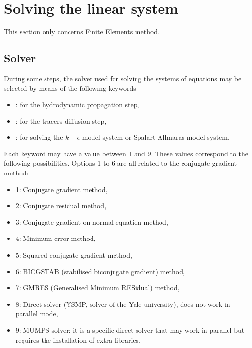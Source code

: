 \section{Solving the linear system}

This section only concerns Finite Elements method.
\subsection{Solver}

During some steps, the solver used for solving the systems of equations
may be selected by means of the following keywords:

\begin{itemize}
\item {}: for the hydrodynamic propagation step,

\item {}: for the tracers diffusion step,

\item {}:
for solving the $k-\epsilon$ model system or Spalart-Allmaras model system.
\end{itemize}

Each keyword may have a value between 1 and 9.
These values correspond to the following possibilities.
Options 1 to 6 are all related to the conjugate gradient method:

\begin{itemize}
\item 1: Conjugate gradient method,

\item 2: Conjugate residual method,

\item 3: Conjugate gradient on normal equation method,

\item 4: Minimum error method,

\item 5: Squared conjugate gradient method,

\item 6: BICGSTAB (stabilised biconjugate gradient) method,

\item 7: GMRES (Generalised Minimum RESidual) method,

\item 8: Direct solver (YSMP, solver of the Yale university),
does not work in parallel mode,

\item 9: MUMPS solver: it is a specific direct solver that may work
in parallel but requires the installation of extra libraries.
\end{itemize}

